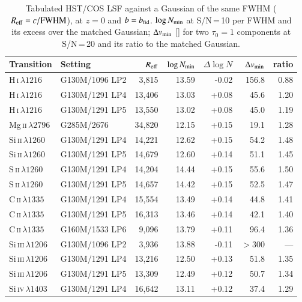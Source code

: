 \begin{table}[h]
\centering\footnotesize
\caption{Tabulated HST/COS LSF against a Gaussian of the same FWHM ($R_{\rm eff}=c/{\rm FWHM}$), at $z=0$ and $b=b_{\rm fid}$.
$\log N_{\rm min}$ at S/N\,=\,10 per FWHM and its excess over the matched Gaussian; $\Delta v_{\rm min}$ [\kms] for two
$\tau_0=1$ components at S/N\,=\,20 and its ratio to the matched Gaussian.}
\label{tab:cos}
\begin{tabular}{llrrrrr}
\toprule
Transition & Setting & $R_{\rm eff}$ & $\log N_{\rm min}$ & $\Delta\log N$ & $\Delta v_{\rm min}$ & ratio\\
\midrule
H\,\textsc{i}\,$\lambda1216$ & G130M/1096 LP2 & 3{,}815 & 13.59 & -0.02 & 156.8 & 0.88 \\
H\,\textsc{i}\,$\lambda1216$ & G130M/1291 LP4 & 13{,}406 & 13.03 & +0.08 & 45.6 & 1.20 \\
H\,\textsc{i}\,$\lambda1216$ & G130M/1291 LP5 & 13{,}550 & 13.02 & +0.08 & 45.0 & 1.19 \\
Mg\,\textsc{ii}\,$\lambda2796$ & G285M/2676 & 34{,}820 & 12.15 & +0.15 & 19.1 & 1.28 \\
Si\,\textsc{ii}\,$\lambda1260$ & G130M/1291 LP4 & 14{,}221 & 12.62 & +0.15 & 54.2 & 1.48 \\
Si\,\textsc{ii}\,$\lambda1260$ & G130M/1291 LP5 & 14{,}679 & 12.60 & +0.14 & 51.1 & 1.45 \\
S\,\textsc{ii}\,$\lambda1260$ & G130M/1291 LP4 & 14{,}204 & 14.44 & +0.15 & 55.6 & 1.50 \\
S\,\textsc{ii}\,$\lambda1260$ & G130M/1291 LP5 & 14{,}657 & 14.42 & +0.15 & 52.5 & 1.47 \\
C\,\textsc{ii}\,$\lambda1335$ & G130M/1291 LP4 & 15{,}554 & 13.49 & +0.14 & 44.8 & 1.41 \\
C\,\textsc{ii}\,$\lambda1335$ & G130M/1291 LP5 & 16{,}313 & 13.46 & +0.14 & 42.1 & 1.40 \\
C\,\textsc{ii}\,$\lambda1335$ & G160M/1533 LP6 & 9{,}096 & 13.79 & +0.11 & 96.4 & 1.36 \\
Si\,\textsc{iii}\,$\lambda1206$ & G130M/1096 LP2 & 3{,}936 & 13.88 & -0.11 & $>300$ & --- \\
Si\,\textsc{iii}\,$\lambda1206$ & G130M/1291 LP4 & 13{,}216 & 12.50 & +0.13 & 51.8 & 1.35 \\
Si\,\textsc{iii}\,$\lambda1206$ & G130M/1291 LP5 & 13{,}309 & 12.49 & +0.12 & 50.7 & 1.34 \\
Si\,\textsc{iv}\,$\lambda1403$ & G130M/1291 LP4 & 16{,}642 & 13.11 & +0.12 & 37.4 & 1.29 \\

\end{tabular}
\end{table}
